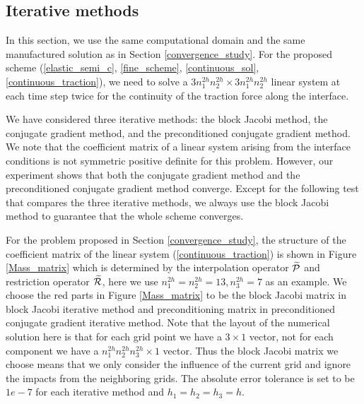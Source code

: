 \subsection{Iterative methods}\label{iterative_section}
In this section, we use the same computational domain and the same manufactured solution as in Section \ref{convergence_study}. For the proposed scheme (\ref{elastic_semi_c}, \ref{fine_scheme}, \ref{continuous_sol}, \ref{continuous_traction}), we need to solve a $3n_1^{2h}n_2^{2h}\times 3n_1^{2h}n_2^{2h}$ linear system at each time step twice for the continuity of the traction force along the interface. 

We have considered three iterative methods: the block Jacobi method, the conjugate gradient method, and the preconditioned conjugate gradient method. We note that the coefficient matrix of a linear system arising from the interface conditions is not symmetric positive definite for this problem. However, our experiment shows that both the conjugate gradient method and the preconditioned conjugate gradient method converge. Except for the following test that compares the three iterative methods, we always use the block Jacobi method to guarantee that the whole scheme converges. 

For the problem proposed in Section \ref{convergence_study}, the structure of the coefficient matrix of the linear system (\ref{continuous_traction}) is shown in Figure \ref{Mass_matrix} which is determined by the interpolation operator $\widetilde{\mathcal{P}}$ and restriction operator $\widetilde{\mathcal{R}}$, here we use $n_1^{2h} = n_2^{2h}=13, n_3^{2h} = 7$ as an example. We choose the red parts in Figure \ref{Mass_matrix} to be the block Jacobi matrix in block Jacobi iterative method and preconditioning matrix in preconditioned conjugate gradient iterative method. Note that the layout of the numerical solution here is that for each grid point we have a $3\times1$ vector, not for each component we have a $n_1^{2h}n_2^{2h}n_3^{2h}\times1$ vector.  Thus the block Jacobi matrix we choose means that we only consider the influence of the current grid and ignore the impacts from the neighboring grids. The absolute error tolerance is set to be $1e-7$ for each iterative method and $h_1 = h_2 = h_3 = h$.

